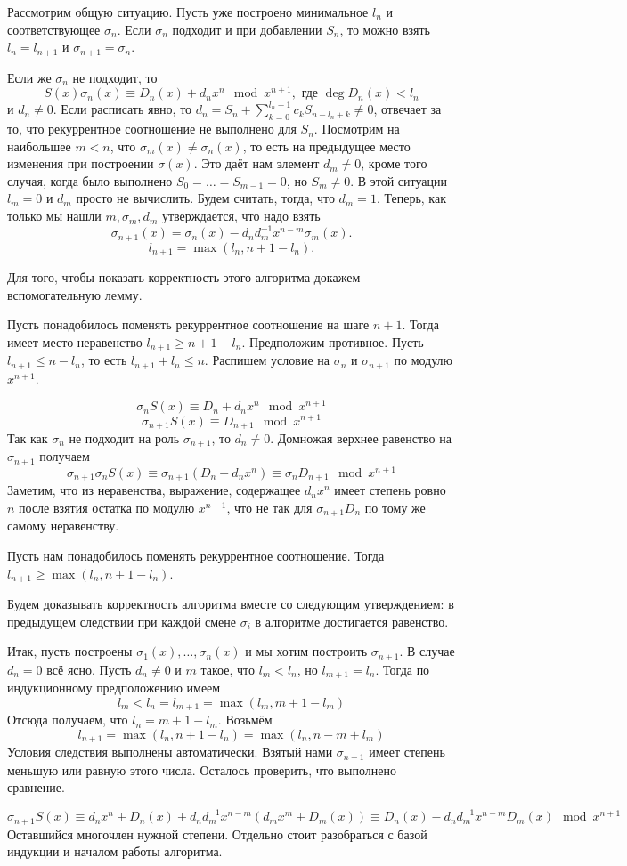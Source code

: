 Рассмотрим общую ситуацию. Пусть уже построено минимальное $l_n$ и соответствующее $\sigma_n$. Если $\sigma_n$ подходит и при добавлении $S_n$, то можно взять $l_n=l_{n+1}$ и $\sigma_{n+1}=\sigma_n$. 

Если же $\sigma_n$ не подходит, то
$$ S(x)\sigma_n(x) \equiv D_n(x)+d_nx^n \mod x^{n+1}, \text{ где } \deg D_n(x) < l_n$$
и $d_n\neq 0$. Если расписать явно, то $d_n=S_n+\sum_{k=0}^{l_n-1} c_k S_{n-l_n+k} \neq 0$, отвечает за то, что рекуррентное соотношение не выполнено для $S_n$. Посмотрим на наибольшее $m<n$, что $\sigma_m(x)\neq \sigma_n(x)$, то есть на предыдущее место изменения при построении $\sigma(x)$. Это даёт нам элемент $d_m\neq 0$, кроме того случая, когда было выполнено $S_0=\dots=S_{m-1}=0$, но $S_m\neq 0$. В этой ситуации $l_m=0$ и $d_m$ просто не вычислить. Будем считать, тогда, что $d_m=1$. Теперь, как только мы нашли $m,\sigma_m,d_m$ утверждается, что надо взять 
$$\sigma_{n+1}(x)= \sigma_n(x) - d_n d_m^{-1} x^{n-m} \sigma_m(x).$$
$$l_{n+1}=\max(l_n,n+1-l_n).$$

Для того, чтобы показать корректность этого алгоритма докажем вспомогательную лемму.

\lm[Ключевая] Пусть понадобилось поменять рекуррентное соотношение на шаге $n+1$. Тогда имеет место неравенство $l_{n+1}\geq n+1-l_n$. 
\elm
\proof  Предположим противное. Пусть $l_{n+1}\leq n-l_n$, то есть $l_{n+1}+l_n\leq n$. Распишем условие на $\sigma_n$ и $\sigma_{n+1}$ по модулю $x^{n+1}$.

$$\sigma_n S(x) \equiv D_n+d_nx^n \mod x^{n+1}$$
$$\sigma_{n+1}S(x)\equiv D_{n+1} \mod x^{n+1}$$
Так как $\sigma_n$ не подходит на роль $\sigma_{n+1}$, то $d_n\neq 0$. Домножая верхнее равенство на $\sigma_{n+1}$ получаем
$$ \sigma_{n+1}\sigma_n S(x) \equiv \sigma_{n+1}(D_n+d_nx^n) \equiv \sigma_n D_{n+1}\mod x^{n+1}$$
Заметим, что из неравенства, выражение, содержащее $d_nx^n$ имеет степень ровно $n$ после взятия остатка по модулю $x^{n+1}$, что не так для $\sigma_{n+1}D_n$ по тому же самому неравенству.
\endproof


\crl Пусть нам понадобилось поменять рекуррентное соотношение. Тогда $l_{n+1}\geq \max (l_n, n+1-l_n)$.
\ecrl

Будем доказывать корректность алгоритма вместе со следующим утверждением: в предыдущем следствии при каждой смене $\sigma_i$ в алгоритме достигается равенство. 

Итак, пусть построены $\sigma_1(x),\dots, \sigma_n(x)$ и мы хотим построить $\sigma_{n+1}$.
В случае $d_n=0$ всё ясно. Пусть $d_n \neq 0$ и $m$ такое, что $l_m<l_n$, но $l_{m+1}=l_n$. Тогда по индукционному предположению имеем 
$$l_m<l_n = l_{m+1}=\max (l_m,m+1-l_m) $$
Отсюда получаем, что $l_n=m+1-l_m$. Возьмём
$$l_{n+1}=\max (l_n,n+1-l_n)=\max (l_n,n-m+l_m)$$
Условия следствия выполнены автоматически. Взятый нами $\sigma_{n+1}$ имеет степень меньшую или равную этого числа. Осталось проверить, что выполнено сравнение. 

$$\sigma_{n+1}S(x)\equiv d_n x^n+ 
D_n(x)+ d_nd_m^{-1}x^{n-m}(d_mx^m+ D_m(x)) \equiv D_n(x)-d_nd_m^{-1}x^{n-m}D_m(x) \mod x^{n+1}
$$
Оставшийся многочлен нужной степени. Отдельно стоит разобраться с базой индукции и началом работы алгоритма.
 

\endproof



